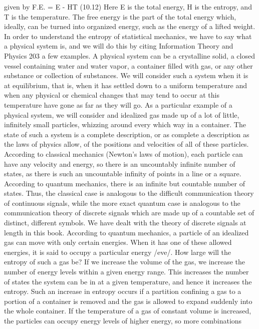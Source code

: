 {{{{{{{{{{{given by
F.E. = E - HT (10.12)
Here E is the total energy, H is the entropy, and T is the temperature.
The free energy is the part of the total energy which, ideally,
can be turned into organized energy, such as the energy of a
lifted weight.
In order to understand the entropy of statistical mechanics, we
have to say what a physical system is, and we will do this by citing
Information Theory and Physics 203
a few examples. A physical system can be a crystalline solid, a
closed vessel containing water and water vapor, a container filled
with gas, or any other substance or collection of substances. We
will consider such a system when it is at equilibrium, that is, when
it has settled down to a uniform temperature and when any physical
or chemical changes that may tend to occur at this temperature
have gone as far as they will go.
As a particular example of a physical system, we will consider
and idealized gas made up of a lot of little, infinitely small particles,
whizzing around every which way in a container.
The state of such a system is a complete description, or as complete
a description as the laws of physics allow, of the positions
and velocities of all of these particles. According to classical
mechanics (Newton’s laws of motion), each particle can have any
velocity and energy, so there is an uncountably infinite number of
states, as there is such an uncountable infinity of points in a line
or a square. According to quantum mechanics, there is an infinite
but countable number of states. Thus, the classical case is analogous
to the difficult communication theory of continuous signals,
while the more exact quantum case is analogous to the communication
theory of discrete signals which are made up of a countable
set of distinct, different symbols. We have dealt with the theory of
discrete signals at length in this book.
According to quantum mechanics, a particle of an idealized gas
can move with only certain energies. When it has one of these
allowed energies, it is said to occupy a particular energy /eve/. How
large will the entropy of such a gas be? If we increase the volume
of the gas, we increase the number of energy levels within a given
energy range. This increases the number of states the system can
be in at a given temperature, and hence it increases the entropy.
Such an increase in entropy occurs if a partition confining a gas
to a portion of a container is removed and the gas is allowed to
expand suddenly into the whole container.
If the temperature of a gas of constant volume is increased, the
particles can occupy energy levels of higher energy, so more combinations
}}}}}}}}}}}
